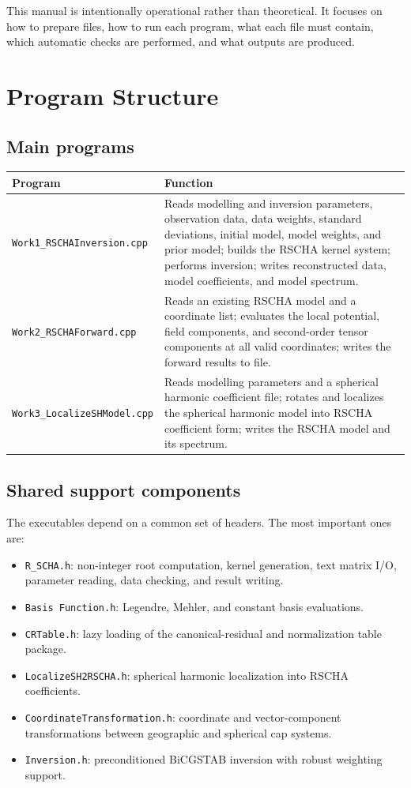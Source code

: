 \documentclass[11pt,a4paper]{article}
\begin{document}
This manual is intentionally operational rather than theoretical. It focuses on how to prepare files, how to run each program, what each file must contain, which automatic checks are performed, and what outputs are produced.

\section{Program Structure}

\subsection{Main programs}

\begin{longtable}{>{\raggedright\arraybackslash}p{} >{\raggedright\arraybackslash}p{}}
\toprule
Program & Function \\
\midrule
\endhead
\texttt{Work1\_RSCHAInversion.cpp} & Reads modelling and inversion parameters, observation data, data weights, standard deviations, initial model, model weights, and prior model; builds the RSCHA kernel system; performs inversion; writes reconstructed data, model coefficients, and model spectrum. \\
\addlinespace
\texttt{Work2\_RSCHAForward.cpp} & Reads an existing RSCHA model and a coordinate list; evaluates the local potential, field components, and second-order tensor components at all valid coordinates; writes the forward results to file. \\
\addlinespace
\texttt{Work3\_LocalizeSHModel.cpp} & Reads modelling parameters and a spherical harmonic coefficient file; rotates and localizes the spherical harmonic model into RSCHA coefficient form; writes the RSCHA model and its spectrum. \\
\bottomrule
\end{longtable}

\subsection{Shared support components}

The executables depend on a common set of headers. The most important ones are:
\begin{itemize}
  \item \texttt{R\_SCHA.h}: non-integer root computation, kernel generation, text matrix I/O, parameter reading, data checking, and result writing.
  \item \texttt{Basis Function.h}: Legendre, Mehler, and constant basis evaluations.
  \item \texttt{CRTable.h}: lazy loading of the canonical-residual and normalization table package.
  \item \texttt{LocalizeSH2RSCHA.h}: spherical harmonic localization into RSCHA coefficients.
  \item \texttt{CoordinateTransformation.h}: coordinate and vector-component transformations between geographic and spherical cap systems.
  \item \texttt{Inversion.h}: preconditioned BiCGSTAB inversion with robust weighting support.
\end{itemize}
\end{document}
